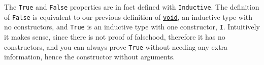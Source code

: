 The \texttt{True} and \texttt{False} properties are in fact defined with \texttt{Inductive}. The definition of \texttt{False} is equivalent to our previous definition of 
\hyperref[lst:void]{\texttt{void}}, an inductive type with no constructors, and 
\texttt{True} is an inductive type with one constructor, \texttt{I}. Intuitively it 
makes sense, since there is not proof of falsehood, therefore it has no constructors, and you can always
prove \texttt{True} without needing any extra information, hence the constructor without 
arguments.

